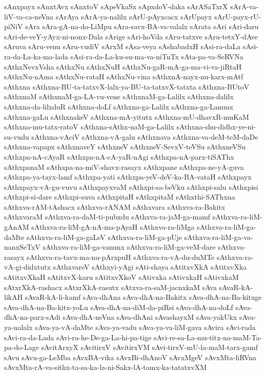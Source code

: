 {sAnxpayx
sAnxtAvx
sAnxtoV
sApeVkaSx
sApxdoV-daka
sArASaTxrX
sArA-va-liV-va-ca-neVna
sArAya
sArA-ya-nalilx
sArU-pAyxcacx
sArUpayx
sArU-payx-rU-piNiV
sAra
sAra-gA-na-do-LiMpu
sAra-savx-BA-va-valalx
sArata
sAri
sAri-daru
sAri-de-veY-yAyx-ni-nonx-Dala
sArige
sAri-hoVda
sAru-tatxve
sAru-tetxY-dAve
sAruva
sAru-venu
sAru-vudiV
sArxM
sAsa-veya
sAshabadxH
sAsi-ra-daLa
sAsi-ra-da-La-ka-ma-lada
sAsi-ra-da-La-ku-su-ma-va-niTuTx
sAta-pa-va-SeRVNa
sAthxNevxVsha
sAthxNu
sAthxNuH
sAthxNu-gaR-mA-ga-ma-vi-va-jiRtaH
sAthxNu-nAma
sAthxNu-rataH
sAthxNu-vina
sAthxnA-nayx-nu-karx-mAtf
sAthxna
sAthxna-BU-ta-tatxvX-lalx-ya-BU-ta-tatxvX-tatxta
sAthxna-BUtoV
sAthxnaM
sAthxnaM-ga-LA-vu-vene
sAthxnaM-ga-Lalilx
sAthxna-dalilx
sAthxna-da-lilxduR
sAthxna-doLf
sAthxna-ga-Lalilx
sAthxna-ga-Lanunx
sAthxna-gaLu
sAthxnakeV
sAthxna-mA-yitutx
sAthxna-mU-dhavxR-muKaM
sAthxna-mu-tatx-ratoV
sAthxna-sAthx-naM-ga-Lalilx
sAthxna-shu-didhx-ye-ni-su-vudu
sAthxna-vAciV
sAthxna-vA-galu
sAthxnava
sAthxna-va-deM-teM-daDe
sAthxna-vapapx
sAthxnaveY
sAthxneV
sAthxneV-SevxV-teVSu
sAthxneVSu
sAthxpa-nA-cAyaR
sAthxpa-nA-cA-yaR-nAgi
sAthxpa-nA-parx-tiSAThx
sAthxpanaM
sAthxpa-na-miV-shavx-rasayx
sAthxpane
sAthxpa-ne-yA-guva
sAthxpa-ya-tayx-lamf
sAthxpa-yati
sAthxpa-yeV-deV-ka-BA-vataH
sAthxpayx
sAthxpayx-vA-gu-vuvu
sAthxpayxvaM
sAthxpi-sa-beVku
sAthxpi-salu
sAthxpisi
sAthxpi-si-dare
sAthxpi-suva
sAthxpitaH
sAthxpitaM
sAthxthi-SAThxna
sAthxva-rAM-tAshacx
sAthxva-rANAM
sAthxvara
sAthxva-ra-Bakitx
sAthxvaraM
sAthxva-ra-daM-ti-pubxdu
sAthxva-ra-jaM-ga-mamf
sAthxva-ra-liM-gAnAM
sAthxva-ra-liM-gA-nA-ma-pAyaH
sAthxva-ra-liMga
sAthxva-ra-liM-ga-daMte
sAthxva-ra-liM-ga-gaLeV
sAthxva-ra-liM-ga-pUje
sAthxva-ra-liM-ga-va-nanxSeTxV
sAthxva-ra-liM-ga-vanunx
sAthxva-ra-liM-ga-veM-dare
sAthxva-rasayx
sAthxva-ra-tavx-ma-nu-pArxpuH
sAthxva-ra-vA-du-duMTe
sAthxva-ra-vA-gi-didxtutx
sAthxvareV
sAthxyi-yAgi
sAti-shaya
sAtitxvXkA
sAtitxvXka
sAtitxvXkaH
sAtitxvX-karu
sAtitxvXkoV
sAtivxka
sAtivxkaH
sAtivxkaM
sAtxrXkA-rashacx
sAtxrXkA-rasutx
sAtxva-ra-saM-jacnxkaM
sAva
sAvaR-kA-likAH
sAvaR-kA-li-kamf
sAva-dhAna
sAva-dhA-na-Bakitx
sAva-dhA-na-Ba-kitxge
sAva-dhA-na-Ba-kitx-yoLu
sAva-dhA-na-diM-da-piRsi
sAva-dhA-na-doLf
sAva-dhA-na-parx-sAdi
sAva-dhA-neVna
sAva-dhAni
sAvashayxM
sAva-yakUkx
sAva-ya-nalalx
sAva-ya-vA-daMte
sAva-ya-vadu
sAva-ya-va-liM-gava
sAvira
sAvi-rada
sAvi-ra-da-Lada
sAvi-ra-he-De-ga-La-hi-pa-tige
sAvi-re-sa-La-mu-titx-na-maM-Ta-pa-do-Lage
sAvitArxyX
sAvitirxV
sAvitirxVM
sAvi-tirxV-mU-la-maM-tarx-gamf
sAvu
sAvu-ga-LeMba
sAvxBA-vika
sAvxBi-dhAnoV
sAvxMgeV
sAvxMta-liRVna
sAvxMta-rA-va-sithx-ta-sa-ka-la-ni-Sakx-lA-tamx-ka-tatatxvXM
}
